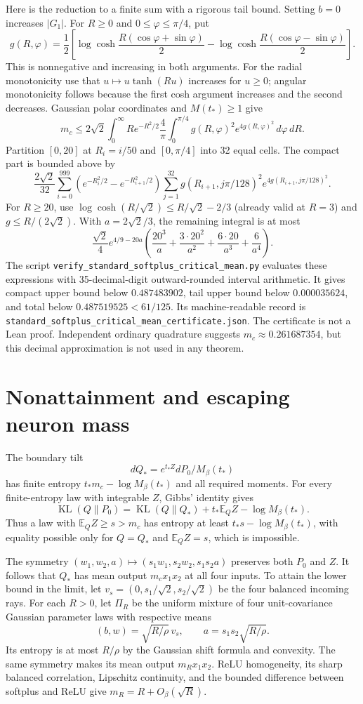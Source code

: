 \documentclass[11pt]{article}
\newcommand{\E}{\mathbb E}
\newcommand{\KL}{\operatorname{KL}}
\begin{document}
Here is the reduction to a finite sum with a rigorous tail bound. Setting
$b=0$ increases $|G_1|$. For $R\ge0$ and $0\le\varphi\le\pi/4$, put
\[
 g(R,\varphi)=\frac12\left[
 \log\cosh\frac{R(\cos\varphi+\sin\varphi)}2
 -\log\cosh\frac{R(\cos\varphi-\sin\varphi)}2\right].
\]
This is nonnegative and increasing in both arguments. For the radial
monotonicity use that $u\mapsto u\tanh(Ru)$ increases for $u\ge0$;
angular monotonicity follows because the first cosh argument increases
and the second decreases. Gaussian polar coordinates and $M(t_*)\ge1$
give
\[
 m_c\le 2\sqrt2\int_0^\infty R e^{-R^2/2}
       \frac4\pi\int_0^{\pi/4}g(R,\varphi)^2e^{4g(R,\varphi)^2}
                                              \,d\varphi\,dR.
\]
Partition $[0,20]$ at $R_i=i/50$ and $[0,\pi/4]$ into 32 equal cells.
The compact part is bounded above by
\[
 \frac{2\sqrt2}{32}\sum_{i=0}^{999}
 (e^{-R_i^2/2}-e^{-R_{i+1}^2/2})
 \sum_{j=1}^{32}g(R_{i+1},j\pi/128)^2
                  e^{4g(R_{i+1},j\pi/128)^2}.
\]
For $R\ge20$, use
$\log\cosh(R/\sqrt2)\le R/\sqrt2-2/3$ (already valid at $R=3$)
and $g\le R/(2\sqrt2)$. With $a=2\sqrt2/3$, the remaining integral
is at most
\[
 \frac{\sqrt2}{4}e^{4/9-20a}
 \left(\frac{20^3}{a}+\frac{3\cdot20^2}{a^2}
                  +\frac{6\cdot20}{a^3}+\frac6{a^4}\right).
\]
The script \texttt{verify\_standard\_softplus\_critical\_mean.py} evaluates
these expressions with 35-decimal-digit outward-rounded interval
arithmetic. It gives compact upper bound below $0.487483902$, tail upper
bound below $0.000035624$, and total below $0.487519525<61/125$.
Its machine-readable record is
\texttt{standard\_softplus\_critical\_mean\_certificate.json}.
The certificate is not a Lean proof. Independent ordinary quadrature
suggests $m_c\approx0.261687354$, but this decimal approximation is not
used in any theorem.

\section{Nonattainment and escaping neuron mass}
The boundary tilt
\[
 dQ_* = e^{t_*Z}dP_0/M_\beta(t_*)
\]
has finite entropy $t_*m_c-\log M_\beta(t_*)$ and all required moments.
For every finite-entropy law with integrable $Z$, Gibbs' identity gives
\[
 \KL(Q\|P_0)=\KL(Q\|Q_*)+t_*\E_QZ-\log M_\beta(t_*).
\]
Thus a law with $\E_QZ\ge s>m_c$ has entropy at least
$t_*s-\log M_\beta(t_*)$, with equality possible only for $Q=Q_*$ and
$\E_QZ=s$, which is impossible.

The symmetry $(w_1,w_2,a)\mapsto(s_1w_1,s_2w_2,s_1s_2a)$ preserves
both $P_0$ and $Z$. It follows that $Q_*$ has mean output
$m_c x_1x_2$ at all four inputs. To attain the lower bound in the limit,
let $v_s=(0,s_1/\sqrt2,s_2/\sqrt2)$ be the four balanced incoming rays.
For each $R>0$, let $\Pi_R$ be the uniform mixture of four unit-covariance
Gaussian parameter laws with respective means
\[
 (b,w)=\sqrt{R/\rho}\,v_s,\qquad
 a=s_1s_2\sqrt{R/\rho}.
\]
Its entropy is at most $R/\rho$ by the Gaussian shift formula and
convexity. The same symmetry makes its mean output $m_R x_1x_2$.
ReLU homogeneity, its sharp balanced correlation, Lipschitz continuity,
and the bounded difference between softplus and ReLU give
$m_R=R+O_\beta(\sqrt R)$.
\end{document}
